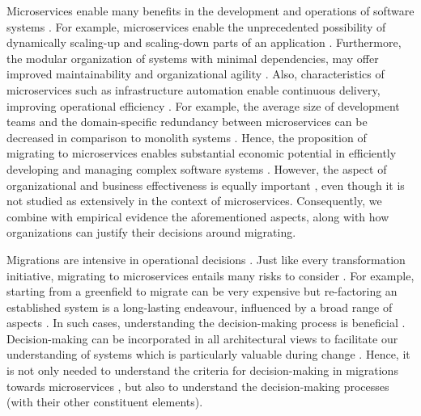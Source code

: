 \documentclass[sigconf,dvipsnames]{acmart}
\begin{document}
Microservices enable many benefits in the development and operations of software systems \cite{Zdun2020}. For example, microservices enable the unprecedented possibility of dynamically scaling-up and scaling-down parts of an application \cite{dragoni2018}. Furthermore, the modular organization of systems with minimal dependencies, may offer improved maintainability \cite{Zdun2020} and organizational agility \cite{Zimmermann2017}. 
Also, characteristics of microservices such as infrastructure automation enable continuous delivery, improving operational efficiency \cite{singleton2016}. For example, the average size of development teams and the domain-specific redundancy between microservices can be decreased in comparison to monolith systems \cite{Mazlami2017}. 
Hence, the proposition of migrating to microservices enables substantial economic potential in efficiently developing and managing complex software systems \cite{singleton2016}.
However, the aspect of organizational and business effectiveness is equally important \cite{Venkatraman1986}, even though it is not studied as extensively in the context of microservices. 
Consequently, we combine with empirical evidence the aforementioned aspects, along with how organizations can justify their decisions around migrating.

Migrations are intensive in operational decisions \cite{Carvalho2019}. Just like every transformation initiative, migrating to microservices entails many risks to consider \cite{Lin2016}. For example, starting from a greenfield to migrate can be very expensive but re-factoring an established system is a long-lasting endeavour, influenced by a broad range of aspects \cite{fritzsch2018monolith}. In such cases, understanding the decision-making process is beneficial \cite{Badampudi2018}. Decision-making can be incorporated in all architectural views to facilitate our understanding of systems which is particularly valuable during change \cite{Kruchten2009}. Hence, it is not only needed to understand the criteria for decision-making in migrations towards microservices \cite{Carvalho2019}, but also to understand the decision-making processes (with their other constituent elements).
\end{document}
